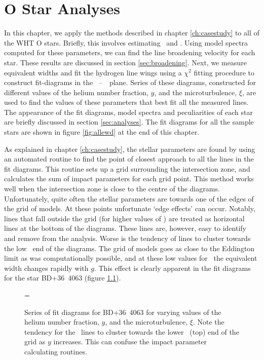 \chapter{O Star Analyses}
\label{ch:analyses}

In this chapter, we apply the methods described in chapter
\ref{ch:casestudy} to all of the WHT O stars. Briefly, this 
involves estimating  \teff\ and \logg. Using model spectra
computed for these parameters, we can find the line broadening velocity for
each star. These results are discussed in section
\ref{sec:broadening}. Next, we measure equivalent widths and fit the
hydrogen line wings using a $\chi^2$ fitting procedure to construct
fit-diagrams in the \teff ~--~\logg\ plane. Series of these diagrams,
constructed for different values of the helium number fraction, $y$,
and the microturbulence, $\xi$, are used to find the values of these
parameters that best fit all the measured lines. The appearance of the
fit diagrams, model spectra and peculiarities of each star are
briefly discussed in section \ref{sec:analyses}. The fit diagrams for
all the sample stars are shown in figure \ref{fig:allewd} at the end
of this chapter.

As explained in chapter \ref{ch:casestudy}, the stellar parameters are
found by using an automated routine to find the point of closest
approach to all the lines in the fit diagrams. This routine sets up a
grid surrounding the intersection zone, and calculates the sum of
impact parameters for each grid point. This method works well when the
intersection zone is close to the centre of the
diagrams. Unfortunately, quite often the stellar parameters are
towards one of the edges of the grid of models. At these points unfortunate
`edge effects' can occur. Notably, lines that fall outside the grid
(for higher values of \logg) are treated as horizontal lines at the
bottom of the diagrams. These lines are, however, easy to identify and
remove from the analysis. Worse is the tendency of lines to cluster
towards the low \logg\ end of the diagrams. The grid of models goes as
close to the Eddington limit as was computationally possible, and at
these low values for \logg\ the equivalent width changes rapidly with
$g$. This effect is clearly apparent in the fit diagrams for the star
BD+36~4063 (figure \ref{fig:ewd:bd+36}).

\begin{figure} %
\epsfxsize=\figwidth
\setlength{\cen}{(\textwidth / 2) - (\epsfxsize / 2)}
\hspace{\cen}
\caption[Fit diagrams for BD+36~4063]
{\fcfont Series of fit diagrams for BD+36~4063 for varying values of
the helium number fraction, $y$, and the microturbulence, $\xi$. Note
the tendency for the \hei\ lines to cluster towards the lower \logg\
(top) end of the grid as $y$ increases. This can confuse the impact
parameter calculating routines.}
\label{fig:ewd:bd+36}
\end{figure} %

